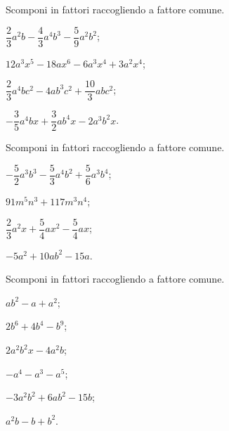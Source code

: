 \begin{esercizio}
\label{ese:13.7}
Scomponi in fattori raccogliendo a fattore comune.
\begin{multicols}{2}
\begin{enumeratea}
 \item $\dfrac{2}{3}a^{2}b-\dfrac{4}{3}a^{4}b^{3}-\dfrac{5}{9}a^{2}b^{2}$;
 \item $12a^{3}x^{5}-18ax^{6}-6a^{3}x^{4}+3a^{2}x^{4}$;
 \item $\dfrac{2}{3}a^{4}bc^{2}-4ab^{3}c^{2}+\dfrac{10}{3}abc^{2}$;
 \item $-{\dfrac{3}{5}}a^{4}bx+\dfrac{3}{2}ab^{4}x-2a^{3}b^{2}x$.
\end{enumeratea}
\end{multicols}
\end{esercizio}
\pagebreak
\begin{esercizio}
\label{ese:13.8}
Scomponi in fattori raccogliendo a fattore comune.
\begin{multicols}{2}
\begin{enumeratea}
 \item $-{\dfrac{5}{2}}a^{3}b^{3}-\dfrac{5}{3}a^{4}b^{2}+\dfrac{5}{6}a^{3}b^{4}$;
 \item $91m^{5}n^{3}+117m^{3}n^{4}$;
 \item $\dfrac{2}{3}a^{2}x+\dfrac{5}{4}ax^{2}-\dfrac{5}{4}ax$;
 \item $-5a^{2}+10ab^{2}-15a$.
\end{enumeratea}
\end{multicols}
\end{esercizio}

\begin{esercizio}
\label{ese:13.9}
Scomponi in fattori raccogliendo a fattore comune.
\begin{multicols}{3}
\begin{enumeratea}
 \item $ab^{2}-a+a^{2}$;
 \item $2b^{6}+4b^{4}-b^{9}$;
 \item $2a^{2}b^{2}x-4a^{2}b$;
 \item $-a^{4}-a^{3}-a^{5}$;
 \item $-3a^{2}b^{2}+6ab^{2}-15b$;
 \item $a^{2}b-b+b^{2}$.
\end{enumeratea}
\end{multicols}
\end{esercizio}

